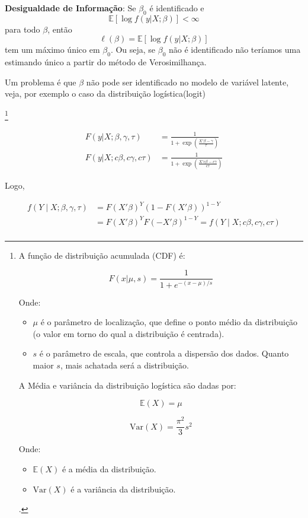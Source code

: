 \documentclass[12pt]{article}
\theoremstyle{break}
\begin{document}
\textbf{Desigualdade de Informação}: Se \(\beta_0\) é identificado e 
    \[
    \mathbb{E}[\log f(y | X; \beta)] < \infty
    \]
    para todo \(\beta\), então
    \[
    \ell(\beta) = \mathbb{E}[\log f(y | X; \beta)]
    \]
    tem um máximo único em \(\beta_0\). Ou seja, se \(\beta_0\) não é identificado não teríamos uma estimando único a partir do método de Verosimilhança. 


Um problema é que \(\beta\) não pode ser identificado no modelo de variável latente, veja, por exemplo o caso da distribuição logística(logit)

\footnote{A função de distribuição acumulada (CDF) é:

\[
F(x|\mu, s) = \frac{1}{1 + e^{-(x - \mu)/s}}
\]


Onde:
\begin{itemize}
    \item \( \mu \) é o parâmetro de localização, que define o ponto médio da distribuição (o valor em torno do qual a distribuição é centrada).
    \item \( s \) é o parâmetro de escala, que controla a dispersão dos dados. Quanto maior \( s \), mais achatada será a distribuição.
\end{itemize}



A Média e variância da distribuição logística são dadas por:

\[
\mathbb{E}(X) = \mu
\]

\[
\text{Var}(X) = \frac{\pi^2}{3}s^2
\]

Onde:
\begin{itemize}
    \item \( \mathbb{E}(X) \) é a média da distribuição.
    \item \( \text{Var}(X) \) é a variância da distribuição.
\end{itemize}. 

}


\begin{align*}
    F(y | X; \beta,\gamma,\tau )  &=  \frac{1}{1 + \exp\left( \frac{ X'\beta  - \gamma}{\tau} \right)} \\
    F(y | X; c\beta,c\gamma,c\tau ) & =  \frac{1}{1 + \exp\left( \frac{ X' c \beta   - c\gamma}{c\tau} \right)} 
\end{align*}


Logo, 


\begin{align*}
    f(Y \mid X;\beta,\gamma,\tau) &= F(X'\beta)^Y (1 - F(X'\beta))^{1-Y}  \\
                  &= F(X'\beta)^Y F(-X'\beta)^{1-Y} = f(Y \mid X;c\beta,c\gamma,c\tau)  \\
\end{align*} 
\end{document}
